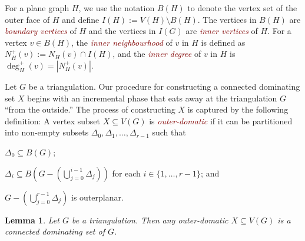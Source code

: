 \documentclass[12pt]{article}
\newtheorem{lem}{Lemma}
\newcommand{\defin}[1]{\emph{\textcolor{Maroon}{#1}}}
\begin{document}
For a plane graph $H$, we use the notation $B(H)$ to denote the vertex set of the outer face of $H$ and define $I(H):=V(H)\setminus B(H)$.  The vertices in $B(H)$ are \defin{boundary vertices} of $H$ and the vertices in $I(G)$ are \defin{inner vertices} of $H$. For a vertex $v\in B(H)$, the \defin{inner neighbourhood} of $v$ in $H$ is defined as $N_H^+(v):=N_H(v)\cap I(H)$, and the \defin{inner degree} of $v$ in $H$ is $\deg^+_H(v)=|N^+_H(v)|$. 

Let $G$ be a triangulation.  Our procedure for constructing a connected dominating set $X$ begins with an incremental phase that eats away at the triangulation $G$ ``from the outside.'' The process of constructing $X$ is captured by the following definition:   A vertex subset $X\subseteq V(G)$ is \defin{outer-domatic} if it can be partitioned into non-empty subsets $\Delta_0,\Delta_1,\ldots,\Delta_{r-1}$ such that 
\begin{compactenum}[(P1)]
    \item $\Delta_0\subseteq B(G)$; \label{outer_face}
    \item $\Delta_i\subseteq B(G-(\bigcup_{j=0}^{i-1}\Delta_j))$ for each $i\in\{1,\ldots,r-1\}$; and \label{incremental}
    \item $G-(\bigcup_{j=0}^{r-1}\Delta_j)$ is outerplanar. \label{outerplanar}
\end{compactenum} 

\begin{lem}\label{outer_domatic}
    Let $G$ be a triangulation.  Then any outer-domatic $X\subseteq V(G)$ is a connected dominating set of $G$.
\end{lem}
\end{document}
